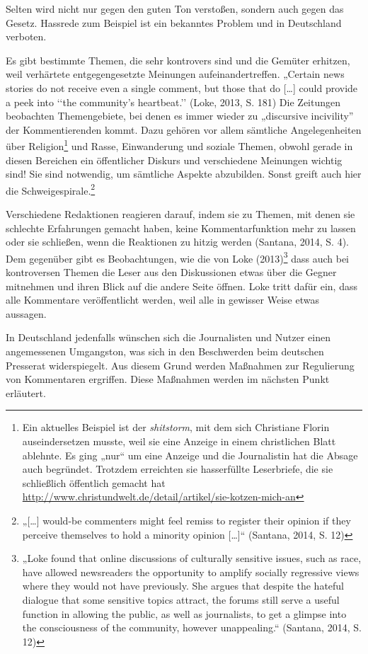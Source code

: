 \begin{enumerate}
Selten wird nicht nur gegen den guten Ton verstoßen, sondern auch gegen das
Gesetz. Hassrede zum Beispiel ist ein bekanntes Problem und in Deutschland
verboten.

Es gibt bestimmte Themen, die sehr kontrovers sind und die Gemüter erhitzen,
weil verhärtete entgegengesetzte Meinungen aufeinandertreffen.   „Certain news
stories do not receive even a single comment, but those that do [\ldots] could
provide a peek into ‘‘the community’s heartbeat.’’ (Loke, 2013, S. 181)
Die Zeitungen beobachten Themengebiete, bei denen es immer wieder zu „discursive
incivility” der Kommentierenden kommt. Dazu gehören vor allem sämtliche
Angelegenheiten über Religion\footnote{Ein aktuelles Beispiel ist der
{\slshape shitstorm}, mit dem sich Christiane Florin auseindersetzen musste, weil
sie eine Anzeige in einem christlichen Blatt ablehnte. Es ging „nur“ um eine
Anzeige und die Journalistin hat die Absage auch begründet. Trotzdem erreichten
sie hasserfüllte Leserbriefe, die sie schließlich öffentlich gemacht hat
\url{http://www.christundwelt.de/detail/artikel/sie-kotzen-mich-an}} und Rasse,
Einwanderung und soziale Themen, obwohl gerade in diesen Bereichen ein
öffentlicher Diskurs und verschiedene Meinungen wichtig sind! Sie sind
notwendig, um sämtliche Aspekte abzubilden. Sonst greift auch hier die
Schweigespirale.\footnote{„[\ldots] would-be commenters might feel remiss
to register their opinion if they perceive themselves to hold a minority opinion
[\ldots]“ (Santana, 2014, S. 12)}


Verschiedene Redaktionen reagieren darauf, indem sie zu Themen, mit denen sie
schlechte Erfahrungen gemacht haben, keine Kommentarfunktion mehr zu lassen oder
sie schließen, wenn die Reaktionen zu hitzig werden (Santana, 2014, S. 4). 
Dem gegenüber gibt es Beobachtungen, wie die von Loke (2013)\footnote{„Loke
found that online discussions of culturally sensitive issues, such as race, have
allowed newsreaders the opportunity to amplify socially regressive views where
they would not have previously. She argues that despite the hateful dialogue
that some sensitive topics attract, the forums still serve a useful function in
allowing the public, as well as journalists, to get a glimpse into the
consciousness of the community, however unappealing.“ (Santana, 2014, S. 12)}
dass auch bei kontroversen Themen die Leser aus den Diskussionen etwas über die
Gegner mitnehmen und ihren Blick auf die andere Seite öffnen. Loke tritt dafür
ein, dass alle Kommentare veröffentlicht werden, weil alle in gewisser Weise
etwas aussagen. 

In Deutschland jedenfalls wünschen sich die Journalisten und Nutzer einen
angemessenen Umgangston, was sich in den Beschwerden beim deutschen Presserat
widerspiegelt. Aus diesem Grund werden Maßnahmen zur Regulierung von Kommentaren
ergriffen. Diese Maßnahmen werden im nächsten Punkt erläutert.



\end{enumerate}

